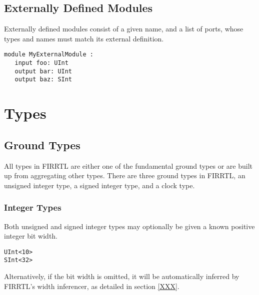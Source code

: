 \documentclass[12pt]{article}
\begin{document}
\subsection{Externally Defined Modules}
Externally defined modules consist of a given name, and a list of ports, whose types and names must match its external definition.

\begin{verbatim}
module MyExternalModule :
   input foo: UInt
   output bar: UInt
   output baz: SInt
\end{verbatim}  




\section{Types}

\subsection{Ground Types}

All types in FIRRTL are either one of the fundamental ground types or are built up from aggregating other types. There are three ground types in FIRRTL, an unsigned integer type, a signed integer type, and a clock type.

\subsubsection{Integer Types}

Both unsigned and signed integer types may optionally be given a known positive integer bit width.

\begin{verbatim}
UInt<10>
SInt<32>
\end{verbatim}  

Alternatively, if the bit width is omitted, it will be automatically inferred by FIRRTL's width inferencer, as detailed in section \ref{XXX}.
\end{document}

